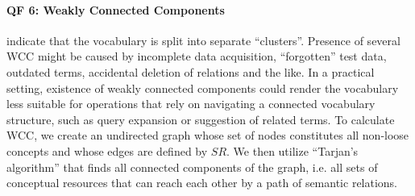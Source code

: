 
\paragraph{\textbf{QF 6: Weakly Connected Components}} indicate that the vocabulary is split into separate ``clusters''. Presence of several WCC might be caused by incomplete data acquisition, ``forgotten'' test data, outdated terms, accidental deletion of relations and the like. In a practical setting, existence of weakly connected components could render the vocabulary less suitable for operations that rely on navigating a connected vocabulary structure, such as query expansion or suggestion of related terms. To calculate WCC, we create an undirected graph whose set of nodes constitutes all non-loose concepts and whose edges are defined by $SR$. We then utilize ``Tarjan’s algorithm''\cite{Hopcroft1973} that finds all connected components of the graph, i.e. all sets of conceptual resources that can reach each other by a path of semantic relations.

 

